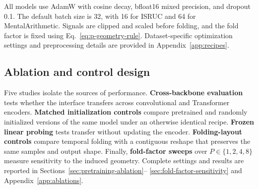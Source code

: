 All models use AdamW \citep{loshchilov2019decoupled} with cosine decay,
bfloat16 mixed precision, and dropout 0.1. The default batch size is 32, with
16 for ISRUC and 64 for MentalArithmetic. Signals are clipped and scaled
before folding, and the fold factor is fixed using
Eq.~\ref{eq:p-geometry-rule}. Dataset-specific optimization settings and
preprocessing details are provided in Appendix~\ref{app:recipes}.

\subsection{Ablation and control design}

Five studies isolate the sources of performance. \textbf{Cross-backbone
evaluation} tests whether the interface transfers across convolutional and
Transformer encoders. \textbf{Matched initialization controls} compare
pretrained and randomly initialized versions of the same model under an
otherwise identical recipe. \textbf{Frozen linear probing} tests transfer
without updating the encoder. \textbf{Folding-layout controls} compare
temporal folding with a contiguous reshape that preserves the same
samples and output shape. Finally, \textbf{fold-factor sweeps} over
$P\in\{1,2,4,8\}$ measure sensitivity to the induced geometry. Complete
settings and results are reported in Sections~\ref{sec:pretraining-ablation}--
\ref{sec:fold-factor-sensitivity} and Appendix~\ref{app:ablations}.
